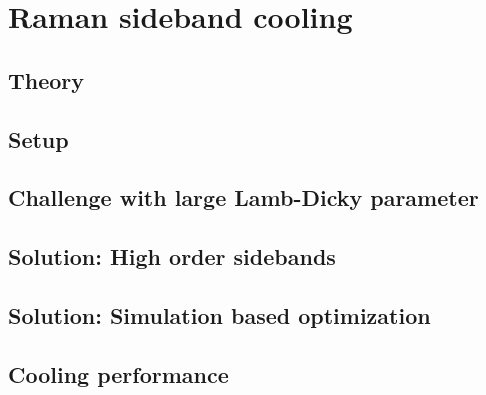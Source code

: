 
\chapter{Raman sideband cooling}

\section{Theory}

\section{Setup}

\section{Challenge with large Lamb-Dicky parameter}

\section{Solution: High order sidebands}

\section{Solution: Simulation based optimization}

\section{Cooling performance}
